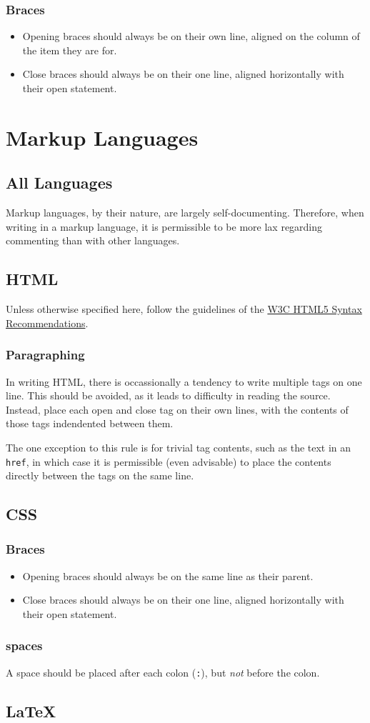 \documentclass[12pt,letter]{memoir} %
\begin{document}
		\subsection{Braces}
			\begin{itemize}
				\item Opening braces should always be on their own line, aligned on the
					column of the item they are for.
				\item Close braces should always be on their one line, aligned horizontally
					with their open statement.
			\end{itemize}

\chapter{Markup Languages}
	\section{All Languages}
		Markup languages, by their nature, are largely self-documenting. Therefore,
		when writing in a markup language, it is permissible to be more lax regarding
		commenting than with other languages.
	\section{HTML}
		Unless otherwise specified here, follow the guidelines of the 
		\href{http://www.w3.org/TR/html5/syntax.html}{W3C HTML5 Syntax Recommendations}.
		\subsection{Paragraphing}
			In writing HTML, there is occassionally a tendency to write multiple tags on
			one line. This should be avoided, as it leads to difficulty in reading the
			source. Instead, place each open and close tag on their own lines, with the
			contents of those tags indendented between them.
			
			The one exception to this rule is for trivial tag contents, such as the text
			in an \texttt{href}, in which case it is permissible (even advisable) to place
			the contents directly between the tags on the same line.
	\section{CSS}
		\subsection{Braces}
			\begin{itemize}
				\item Opening braces should always be on the same line as their parent.
				\item Close braces should always be on their one line, aligned horizontally
					with their open statement.
			\end{itemize}
		\subsection{spaces}
			A space should be placed after each colon (\texttt{:}), but \emph{not} before
			the colon.
	\section{\LaTeX}
		
	
\end{document}
